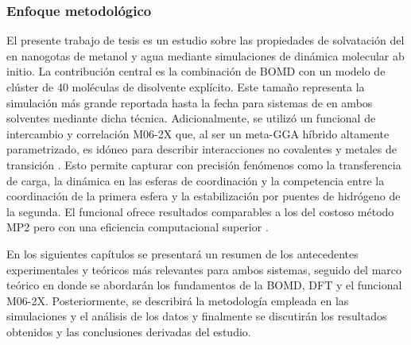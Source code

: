 \subsubsection*{Enfoque metodológico}
El presente trabajo de tesis es un estudio sobre las propiedades de solvatación del  en nanogotas de metanol y agua mediante simulaciones de dinámica molecular ab initio. La contribución central es la combinación de BOMD con un modelo de clúster de 40 moléculas de disolvente explícito. Este tamaño representa la simulación más grande reportada hasta la fecha para sistemas de  en ambos solventes mediante dicha técnica. Adicionalmente, se utilizó un funcional de intercambio y correlación M06-2X que, al ser un meta-GGA híbrido altamente parametrizado, es idóneo para describir interacciones no covalentes y metales de transición \cite{DFT-2008-01}. Esto permite capturar con precisión fenómenos como la transferencia de carga, la dinámica en las esferas de coordinación y la competencia entre la coordinación de la primera esfera y la estabilización por puentes de hidrógeno de la segunda. El funcional ofrece resultados comparables a los del costoso método MP2 pero con una eficiencia computacional superior \cite{Me-2023-01}. 

En los siguientes capítulos se presentará un resumen de los antecedentes experimentales y teóricos más relevantes para ambos sistemas, seguido del marco teórico en donde se abordarán los fundamentos de la BOMD, DFT y el funcional M06-2X. Posteriormente, se describirá la metodología empleada en las simulaciones y el análisis de los datos y finalmente se discutirán los resultados obtenidos y las conclusiones derivadas del estudio.

